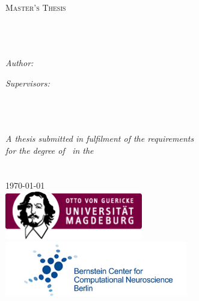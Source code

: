 \documentclass[11pt, oneside]{Thesis} %
\begin{document}
\begin{titlepage}
\begin{center}

\textsc{\LARGE \univname}\\[1.5cm] %
\textsc{\Large Master's Thesis}\\[0.5cm] %

\HRule \\[0.4cm] %
{\huge \bfseries \ttitle}\\[0.4cm] %
\HRule \\[1.5cm] %
 
\begin{minipage}{0.4\textwidth}
\begin{flushleft} \large
\emph{Author:}\\
\href{https://github.com/sheyma}{\authornames} %
\end{flushleft}
\end{minipage}
\begin{minipage}{0.4\textwidth}
\begin{flushright} \large
\emph{Supervisors:} \\
\href{http://kobi.nat.uni-magdeburg.de/user/29 }{\supnamea}\\ %
\href{https://www.itp.tu-berlin.de/bccn-nachwuchsgruppe_nonlinear_dynamics_and_control_in_neuroscience/hoevel/mitglieder/phoevel/}{\supnameb} \\
\href{https://www.itp.tu-berlin.de/bccn-nachwuchsgruppe_nonlinear_dynamics_and_control_in_neuroscience/hoevel/mitglieder/promovierte_mitarbeiterinnen/dr_vesna_vuksanovic/}{\supnamec}
\end{flushright}
\end{minipage}\\[3cm]
 
\large \textit{A thesis submitted in fulfilment of the requirements\\ for the degree of \degreename \, in the}\\[0.3cm] %
\groupname\\\deptname\\[2cm] %
 
{\large \today}\\[1cm] %
\includegraphics[width=6cm]{logo_ovgu.png} %
\includegraphics[width=8cm]{logo_bccn.png} %
 

\end{center}
\end{titlepage}
\end{document}
